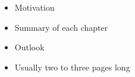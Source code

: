 


\makeatletter
\renewcommand{\@makefnmark}{{\sufigures\@makefnmarkorig}}
\makeatother

\noindent%

\begin{itemize}
    \item Motivation
    \item Summary of each chapter
    \item Outlook
    
    \item Usually two to three pages long
\end{itemize}

\cite{Gerhardt2017} 
